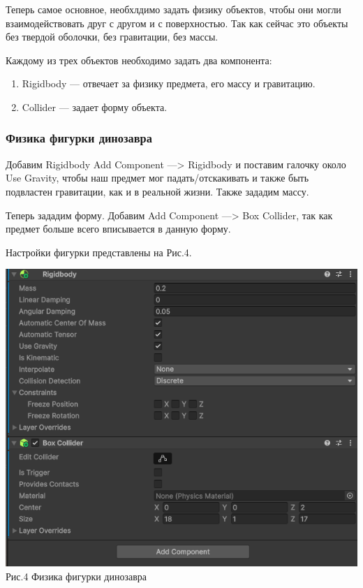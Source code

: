 \documentclass[a4paper,12pt]{article}
\begin{document}
Теперь самое основное, необхлдимо задать физику объектов, чтобы они могли взаимодействовать друг с другом и с поверхностью. Так как сейчас это объекты без твердой оболочки, без гравитации, без массы.

Каждому из трех объектов необходимо задать два компонента:

\begin{enumerate}
	\item Rigidbody — отвечает за физику предмета, его массу и гравитацию.
	\item Collider — задает форму объекта.
\end{enumerate}

\subsubsection{Физика фигурки динозавра}

Добавим Rigidbody Add Component —> Rigidbody и поставим галочку около Use Gravity, чтобы наш предмет мог падать/отскакивать и также быть подвластен гравитации, как и в реальной жизни. Также зададим массу.

Теперь зададим форму. Добавим  Add Component —> Box Collider, так как предмет больше всего вписывается в данную форму. 

Настройки фигурки представлены на Рис.4.

\begin{center}
	\includegraphics[scale = 0.5]{4.png}\\
	Рис.4 Физика фигурки динозавра
\end{center}
\end{document}
